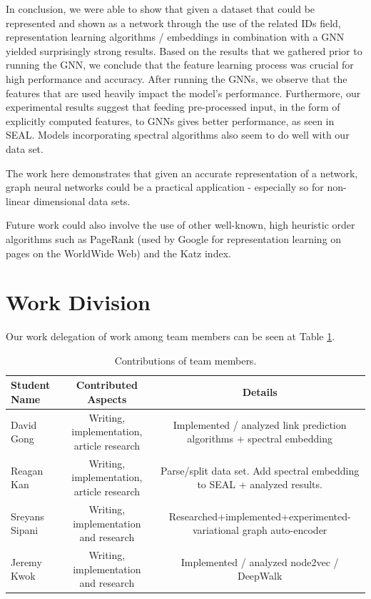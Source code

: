 \documentclass[10pt,twocolumn,letterpaper]{article}
\begin{document}
In conclusion, we were able to show that given a dataset that could be represented and shown as a network through the use of the related IDs field, representation learning algorithms / embeddings in combination with a GNN yielded surprisingly strong results. Based on the results that we gathered prior to running the GNN, we conclude that the feature learning process was crucial for high performance and accuracy. After running the GNNs, we observe that the features that are used heavily impact the model's performance. Furthermore, our experimental results suggest that feeding pre-processed input, in the form of explicitly computed features, to GNNs gives better performance, as seen in SEAL. Models incorporating spectral algorithms also seem to do well with our data set.

The work here demonstrates that given an accurate representation of a network, graph neural networks could be a practical application - especially so for non-linear dimensional data sets.

Future work could also involve the use of other well-known, high heuristic order algorithms such as PageRank (used by Google for representation learning on pages on the WorldWide Web) and the Katz index. 

\section{Work Division}

Our work delegation of work among team members can be seen at Table \ref{tab:contributions}.

\begin{table}
\begin{left}
\begin{tabular}{|l|c|c|}
\hline
Student Name & Contributed Aspects & Details \\
\hline\hline
David Gong & Writing, implementation, article research & Implemented / analyzed link prediction algorithms + spectral embedding \\
Reagan Kan & Writing, implementation, article research & Parse/split data set. Add spectral embedding to SEAL + analyzed results. \\
Sreyans Sipani & Writing, implementation and research & Researched+implemented+experimented-variational graph auto-encoder \\
Jeremy Kwok & Writing, implementation and research & Implemented / analyzed node2vec / DeepWalk\\
\hline
\end{tabular}
\end{left}
\caption{Contributions of team members.}
\label{tab:contributions}
\end{table}
\end{document}
